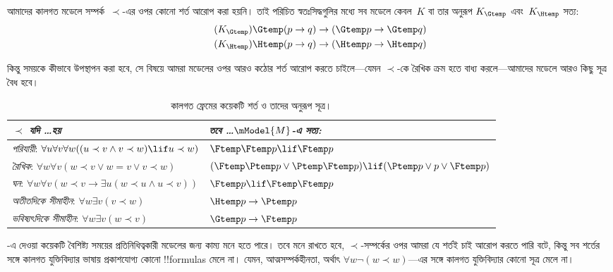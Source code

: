 \documentclass[../../../include/open-logic-section]{subfiles}
\begin{document}


আমাদের কালগত মডেলে সম্পর্ক~$\prec$-এর ওপর কোনো শর্ত আরোপ করা হয়নি। তাই পরিচিত স্বতঃসিদ্ধগুলির মধ্যে সব মডেলে কেবল~$K$ বা তার অনুরূপ $K_{\Gtemp}$ এবং~$K_{\Htemp}$ সত্য:
\begin{align*}
\tag{$K_{\Gtemp}$}  \Gtemp (p \to q) & \to (\Gtemp p \to \Gtemp q)\\
\tag{$K_{\Htemp}$}  \Htemp (p \to q) & \to (\Htemp p \to \Htemp q)
\end{align*}

কিন্তু সময়কে কীভাবে উপস্থাপন করা হবে, সে বিষয়ে আমরা মডেলের ওপর আরও কঠোর শর্ত আরোপ করতে চাইলে—যেমন $\prec$-কে রৈখিক ক্রম হতে বাধ্য করলে—আমাদের মডেলে আরও কিছু সূত্র বৈধ হবে।

\begin{table}[t]
  \begin{tabular}{| p{} || p{} |}
    \hline
    {\emph{$\prec$ যদি \dots হয়}} & {\emph{তবে \dots $\mModel{M}$-এ সত্য:}} \\
    \hline \hline
    \emph{পরিযায়ী}: \newline
    $\forall u \forall v \forall w ((u \prec v \land v \prec w) \lif u \prec w)$ &
    $\Ftemp \Ftemp p \lif \Ftemp p$  \\
    \hline
    \emph{রৈখিক}: \newline
    $\forall w \forall v (w \prec v \lor w = v \lor v \prec w)$ &
    $(\Ftemp \Ptemp  p \lor \Ptemp \Ftemp p) \lif (\Ptemp p \lor p \lor \Ftemp p)$\\
    \hline
    \emph{ঘন}: \newline
    $\forall w \forall v (w \prec v \to \exists u(w \prec u \land u \prec v))$ &
    $\Ftemp p \lif \Ftemp \Ftemp p$ \\
    \hline
    \emph{অতীতদিকে সীমাহীন}: \newline
    $\forall w \exists v( v \prec w)$ &
    $\Htemp p \to \Ptemp p$ \\
    \hline
    \emph{ভবিষ্যৎদিকে সীমাহীন}: \newline
    $\forall w \exists v( w \prec v)$ &
    $\Gtemp p \to \Ftemp p$ \\
    \hline
  \end{tabular}
  \caption{কালগত ফ্রেমের কয়েকটি শর্ত ও তাদের অনুরূপ সূত্র।}
\end{table}

-এ দেওয়া কয়েকটি বৈশিষ্ট্য সময়ের প্রতিনিধিত্বকারী মডেলের জন্য কাম্য মনে হতে পারে। তবে মনে রাখতে হবে, $\prec$-সম্পর্কের ওপর আমরা যে শর্তই চাই আরোপ করতে পারি বটে, কিন্তু সব শর্তের সঙ্গে কালগত যুক্তিবিদ্যার ভাষায় প্রকাশযোগ্য কোনো !!{formula}s মেলে না। যেমন, আত্মসম্পর্কহীনতা, অর্থাৎ $\forall w \lnot (w \prec w)$—এর সঙ্গে কালগত যুক্তিবিদ্যার কোনো সূত্র মেলে না।
\end{document}
